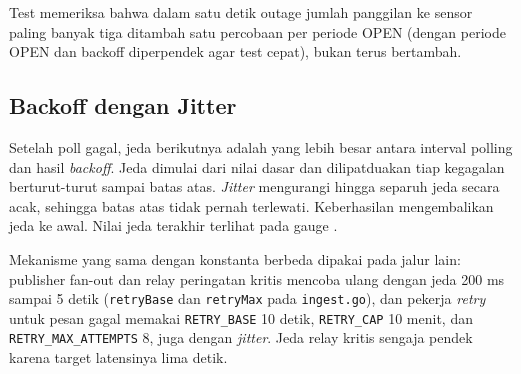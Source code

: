 
Test  memeriksa bahwa dalam satu detik outage jumlah panggilan ke sensor paling banyak tiga ditambah satu percobaan per periode OPEN (dengan periode OPEN dan backoff diperpendek agar test cepat), bukan terus bertambah.

\subsection{Backoff dengan Jitter}

Setelah poll gagal, jeda berikutnya adalah yang lebih besar antara interval polling dan hasil \textit{backoff}. Jeda dimulai dari nilai dasar dan dilipatduakan tiap kegagalan berturut-turut sampai batas atas. \textit{Jitter} mengurangi hingga separuh jeda secara acak, sehingga batas atas tidak pernah terlewati. Keberhasilan mengembalikan jeda ke awal. Nilai jeda terakhir terlihat pada gauge .


Mekanisme yang sama dengan konstanta berbeda dipakai pada jalur lain: publisher fan-out dan relay peringatan kritis mencoba ulang dengan jeda 200 ms sampai 5 detik (\texttt{retryBase} dan \texttt{retryMax} pada \texttt{ingest.go}), dan pekerja \textit{retry} untuk pesan gagal memakai \texttt{RETRY\_BASE} 10 detik, \texttt{RETRY\_CAP} 10 menit, dan \texttt{RETRY\_MAX\_ATTEMPTS} 8, juga dengan \textit{jitter}. Jeda relay kritis sengaja pendek karena target latensinya lima detik.

